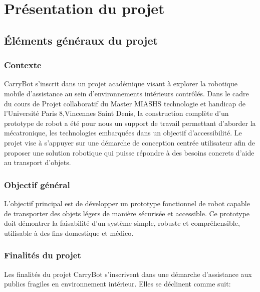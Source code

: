 \documentclass[12pt,a4paper]{article}
\begin{document}
\section{Présentation du projet}

\subsection{Éléments généraux du projet}

\subsubsection{Contexte}
CarryBot s’inscrit dans un projet académique visant à explorer la robotique mobile d’assistance au sein d’environnements intérieurs contrôlés. 
Dans le cadre du cours de Projet collaboratif du Master MIASHS technologie et handicap de l’Université Paris 8,Vincennes Saint Denis, la construction complète d’un prototype de robot a été pour nous un support de travail permettant d’aborder la mécatronique, les technologies embarquées dans un objectif d’accessibilité.  
Le projet vise à s’appuyer sur une démarche de conception centrée utilisateur afin de proposer une solution robotique qui puisse répondre à des besoins concrets d’aide au transport d’objets.

\subsubsection{Objectif général}
L’objectif principal est de développer un prototype fonctionnel de robot capable de transporter des objets légers de manière sécurisée et accessible.  
Ce prototype doit démontrer la faisabilité d’un système simple, robuste et compréhensible, utilisable à des fins domestique et médico.

\subsubsection{Finalités du projet}

Les finalités du projet CarryBot s’inscrivent dans une démarche d’assistance aux publics fragiles en environnement intérieur. Elles se déclinent comme suit:
\end{document}
